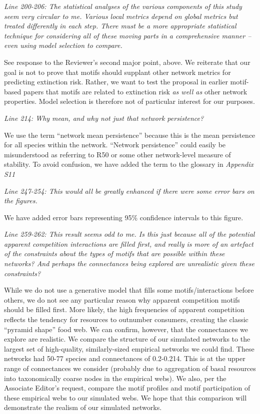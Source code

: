 \documentclass[12pt]{article}
\newcommand{\us}{\rm \setlength{\leftskip}{0.3cm} \setlength{\rightskip}{0.3cm}}
\newcommand{\them}{\it \setlength{\leftskip}{0cm} \setlength{\rightskip}{0cm}}
\begin{document}
        \them
        Line 200-206: The statistical analyses of the various components of this study seem very circular to me. Various local metrics depend on global metrics but treated differently in each step. There must be a more appropriate statistical technique for considering all of these moving parts in a comprehensive manner – even using model selection to compare.
        
        \us See response to the Reviewer's second major point, above. We reiterate that our goal is not to prove that motifs should supplant other network metrics for predicting extinction risk. Rather, we want to test the proposal in earlier motif-based papers that motifs are related to extinction risk \emph{as well as} other network properties. Model selection is therefore not of particular interest for our purposes.
        
        \them
        Line 214: Why mean, and why not just that network persistence?
        
        \us We use the term ``network mean persistence'' because this is the mean persistence for all species within the network. ``Network persistence'' could easily be misunderstood as referring to R50 or some other network-level measure of stability. To avoid confusion, we have added the term to the glossary in \emph{Appendix S11}
        
        
        \them
        Line 247-254: This would all be greatly enhanced if there were some error bars on the figures.
        
        \us We have added error bars representing 95\% confidence intervals to this figure.
        
        \them
        Line 259-262: This result seems odd to me. Is this just because all of the potential apparent competition interactions are filled first, and really is more of an artefact of the constraints about the types of motifs that are possible within these networks? And perhaps the connectances being explored are unrealistic given these constraints?
        
        \us While we do not use a generative model that fills some motifs/interactions before others, we do not see any particular reason why apparent competition motifs should be filled first. More likely, the high frequencies of apparent competition reflects the tendency for resources to outnumber consumers, creating the classic ``pyramid shape'' food web. We can confirm, however, that the connectances we explore are realistic. We compare the structure of our simulated networks to the largest set of high-quality, similarly-sized empirical networks we could find. These networks had 50-77 species and connectances of 0.2-0.214. This is at the upper range of connectances we consider (probably due to aggregation of basal resources into taxonomically coarse nodes in the empirical webs). We also, per the Associate Editor's request, compare the motif profiles and motif participation of these empirical webs to our simulated webs. We hope that this comparison will demonstrate the realism of our simulated networks.
        
\end{document}
